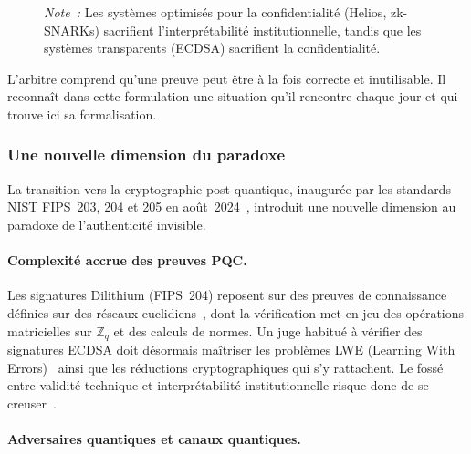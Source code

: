 \begin{sloppypar}
\begin{figure}[htbp]
\smallskip
\begin{minipage}{\linewidth}
  \small\textit{Note~:} Les syst\`emes optimis\'es pour la confidentialit\'e
  (Helios, zk-SNARKs) sacrifient l'interpr\'etabilit\'e institutionnelle,
  tandis que les syst\`emes transparents (ECDSA) sacrifient la confidentialit\'e.
\end{minipage}

\end{figure}

\begin{boiteArbitre}
L'arbitre comprend qu'une preuve peut \^etre \`a la fois correcte
et inutilisable. Il reconna\^it dans cette formulation une situation qu'il
rencontre chaque jour et qui trouve ici sa formalisation.
\end{boiteArbitre}

\subsubsection{Une nouvelle dimension du paradoxe}
\label{subsubsec:nouvelle_dimension}

La transition vers la cryptographie post-quantique, inaugur\'ee par les
standards NIST FIPS~203, 204 et 205 en ao\^ut~2024~\cite{NISTPQC,Alagic2020,NISTPostQuantum2022}, introduit une nouvelle dimension au paradoxe de l'authenticit\'e invisible.

\paragraph{Complexit\'e accrue des preuves PQC.}
\label{par:complexite_pqc}

Les signatures Dilithium (FIPS~204) reposent sur des preuves de connaissance
d\'efinies sur des r\'eseaux euclidiens~\cite{Dilithium2022,Langlois2015}, dont la v\'erification met en jeu des op\'erations matricielles
sur $\mathbb{Z}_q$ et des calculs de normes. Un juge habitu\'e \`a v\'erifier des signatures
ECDSA doit d\'esormais ma\^itriser les probl\`emes LWE (Learning With Errors)~\cite{Regev2009}
ainsi que les r\'eductions cryptographiques qui s'y rattachent. Le foss\'e entre validit\'e technique et interpr\'etabilit\'e
institutionnelle risque donc de se creuser~\cite{Ravi2020}.

\paragraph{Adversaires quantiques et canaux quantiques.}
\label{par:adversaires_quantiques}


\end{sloppypar}
